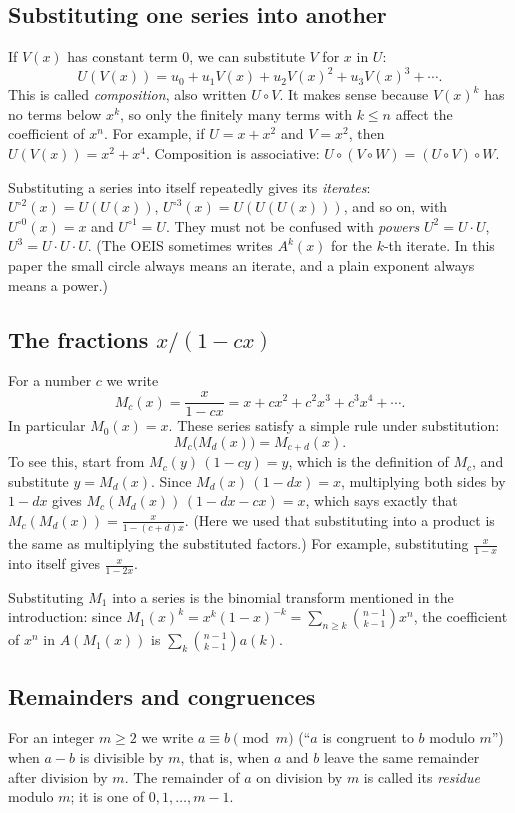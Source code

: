 \documentclass[11pt,a4paper]{article}
\theoremstyle{definition}
\theoremstyle{remark}
\begin{document}
\subsection{Substituting one series into another}
If $V(x)$ has constant term $0$, we can substitute $V$ for $x$ in $U$:
\[
U(V(x))=u_0+u_1V(x)+u_2V(x)^2+u_3V(x)^3+\cdots .
\]
This is called \emph{composition}, also written $U\circ V$. It makes sense because $V(x)^k$ has no terms below $x^k$,
so only the finitely many terms with $k\le n$ affect the coefficient of $x^n$. For example, if $U=x+x^2$ and $V=x^2$, then
$U(V(x))=x^2+x^4$. Composition is associative: $U\circ(V\circ W)=(U\circ V)\circ W$.

Substituting a series into itself repeatedly gives its \emph{iterates}: $U^{\circ2}(x)=U(U(x))$,
$U^{\circ3}(x)=U(U(U(x)))$, and so on, with $U^{\circ0}(x)=x$ and $U^{\circ1}=U$. They must not be confused with
\emph{powers} $U^2=U\cdot U$, $U^3=U\cdot U\cdot U$. (The OEIS sometimes writes $A^k(x)$ for the $k$-th iterate. In
this paper the small circle always means an iterate, and a plain exponent always means a power.)

\subsection{The fractions \texorpdfstring{$x/(1-cx)$}{x/(1-cx)}}
For a number $c$ we write
\[
M_c(x)=\frac{x}{1-cx}=x+cx^2+c^2x^3+c^3x^4+\cdots .
\]
In particular $M_0(x)=x$. These series satisfy a simple rule under substitution:
\begin{equation}\label{eq:mobius}
M_c\bigl(M_d(x)\bigr)=M_{c+d}(x).
\end{equation}
To see this, start from $M_c(y)\,(1-cy)=y$, which is the definition of $M_c$, and substitute $y=M_d(x)$. Since
$M_d(x)\,(1-dx)=x$, multiplying both sides by $1-dx$ gives $M_c(M_d(x))\,(1-dx-cx)=x$, which says exactly that
$M_c(M_d(x))=\frac{x}{1-(c+d)x}$. (Here we used that substituting into a product is the same as multiplying the
substituted factors.) For example, substituting $\frac{x}{1-x}$ into itself gives $\frac{x}{1-2x}$.

Substituting $M_1$ into a series is the binomial transform mentioned in the introduction: since
$M_1(x)^k=x^k(1-x)^{-k}=\sum_{n\ge k}\binom{n-1}{k-1}x^n$, the coefficient of $x^n$ in $A(M_1(x))$ is
$\sum_k\binom{n-1}{k-1}a(k)$.

\subsection{Remainders and congruences}
For an integer $m\ge2$ we write $a\equiv b\pmod m$ (``$a$ is congruent to $b$ modulo $m$'') when $a-b$ is divisible by
$m$, that is, when $a$ and $b$ leave the same remainder after division by $m$. The remainder of $a$ on division by
$m$ is called its \emph{residue} modulo $m$; it is one of $0,1,\dots,m-1$.
\end{document}
